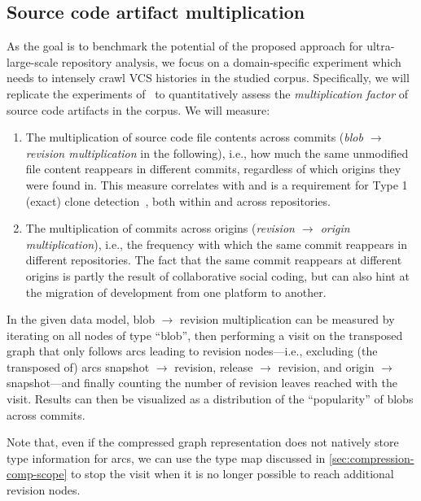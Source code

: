 \subsection{Source code artifact multiplication}%
\label{sec:compression-expmultiplication}

As the goal is to benchmark the potential of the proposed approach for
ultra-large-scale repository analysis, we focus on a domain-specific experiment
which needs to intensely crawl VCS histories in the studied corpus.
Specifically, we will replicate the experiments of~\cite{swh-provenance-emse} to
quantitatively assess the \emph{multiplication factor} of source code artifacts
in the corpus. We will measure:
\begin{enumerate}

\item The multiplication of source code file contents across commits
  (\emph{blob $\to$ revision multiplication} in the following), i.e., how much
  the same unmodified file content reappears in different commits, regardless
  of which origins they were found in. This measure correlates with and
  is a requirement for Type 1 (exact) clone
  detection~\cite{bellon2007comparison}, both within and across repositories.

\item The multiplication of commits across origins (\emph{revision $\to$ origin
  multiplication}), i.e., the frequency with which the same commit reappears
  in different repositories. The fact that the same commit reappears at
  different origins is partly the result of collaborative social coding,
  but can also hint at the migration of development from one platform to
  another.

\end{enumerate}

In the given data model, blob $\to$ revision multiplication can be measured by
iterating on all nodes of type ``blob'', then performing a visit on the
transposed graph that only follows arcs leading to revision nodes---i.e.,
excluding (the transposed of) arcs snapshot $\to$ revision, release $\to$
revision, and origin $\to$ snapshot---and finally counting the number of
revision leaves reached with the visit. Results can then be visualized as a
distribution of the ``popularity'' of blobs across commits.

Note that, even if the compressed graph representation does not natively store
type information for arcs, we can use the type map discussed in
\cref{sec:compression-comp-scope} to stop the visit when it is no longer
possible to reach additional revision nodes.


